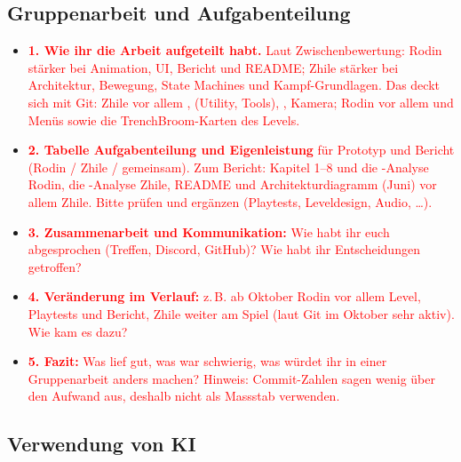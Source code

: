 \documentclass[../Main.tex]{subfiles}
\begin{document}
\subsection{Gruppenarbeit und Aufgabenteilung}

\begin{itemize}[leftmargin=1.5cm]
    \item \textcolor{red}{\textbf{1. Wie ihr die Arbeit aufgeteilt habt.} Laut Zwischenbewertung: Rodin stärker bei Animation, UI, Bericht und README; Zhile stärker bei Architektur, Bewegung, State Machines und Kampf-Grundlagen. Das deckt sich mit Git: Zhile vor allem ,  (Utility, Tools), , Kamera; Rodin vor allem  und Menüs sowie die TrenchBroom-Karten des Levels.}
    \item \textcolor{red}{\textbf{2. Tabelle Aufgabenteilung und Eigenleistung} für Prototyp und Bericht (Rodin / Zhile / gemeinsam). Zum Bericht: Kapitel 1--8 und die -Analyse Rodin, die -Analyse Zhile, README und Architekturdiagramm (Juni) vor allem Zhile. Bitte prüfen und ergänzen (Playtests, Leveldesign, Audio, \ldots).}
    \item \textcolor{red}{\textbf{3. Zusammenarbeit und Kommunikation:} Wie habt ihr euch abgesprochen (Treffen, Discord, GitHub)? Wie habt ihr Entscheidungen getroffen?}
    \item \textcolor{red}{\textbf{4. Veränderung im Verlauf:} z.\,B. ab Oktober Rodin vor allem Level, Playtests und Bericht, Zhile weiter am Spiel (laut Git im Oktober sehr aktiv). Wie kam es dazu?}
    \item \textcolor{red}{\textbf{5. Fazit:} Was lief gut, was war schwierig, was würdet ihr in einer Gruppenarbeit anders machen? Hinweis: Commit-Zahlen sagen wenig über den Aufwand aus, deshalb nicht als Massstab verwenden.}
\end{itemize}

\subsection{Verwendung von KI} \label{sec:ReflexionKI}
\end{document}
